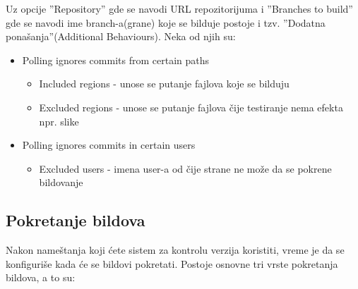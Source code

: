 Uz opcije ''Repository'' gde se navodi URL repozitorijuma i ''Branches to build'' gde se navodi ime branch-a(grane) koje se bilduje postoje i tzv. ''Dodatna ponašanja''(Additional Behaviours). Neka od njih su:
 
\begin{itemize}  
\item Polling ignores commits from certain paths
\begin{itemize}
\item Included regions - unose se putanje fajlova koje se bilduju
\item Excluded regions - unose se putanje fajlova čije testiranje nema efekta npr. slike
\end{itemize}
\item Polling ignores commits in certain users 
\begin{itemize}
\item Excluded users - imena user-a od čije strane ne može da se pokrene bildovanje
\end{itemize}
\end{itemize}

\subsection{Pokretanje bildova}

Nakon nameštanja koji ćete sistem za kontrolu verzija koristiti, vreme je da se konfiguriše kada će se bildovi pokretati. Postoje osnovne tri vrste pokretanja bildova, a to su:

